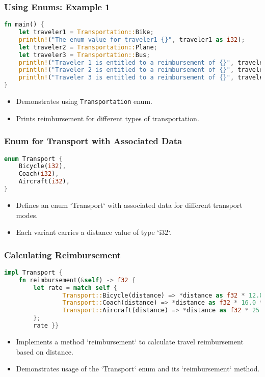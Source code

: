 \documentclass[aspectratio=169, table]{beamer}
\begin{document}
\begin{frame}[fragile]
\frametitle{Using Enums: Example 1}
\vspace{15pt}
\begin{lstlisting}[language=Rust]
fn main() {
	let traveler1 = Transportation::Bike;
	println!("The enum value for traveler1 {}", traveler1 as i32);
	let traveler2 = Transportation::Plane; 
	let traveler3 = Transportation::Bus;
	println!("Traveler 1 is entitled to a reimbursement of {}", traveler1.reimbursement(70)); 
	println!("Traveler 2 is entitled to a reimbursement of {}", traveler2.reimbursement(150)); 
	println!("Traveler 3 is entitled to a reimbursement of {}", traveler3.reimbursement(70)); 
}
\end{lstlisting}
\begin{itemize}
\item Demonstrates using \texttt{Transportation} enum.
\item Prints reimbursement for different types of transportation.
\end{itemize}
\end{frame}

\begin{frame}[fragile]
\frametitle{Enum for Transport with Associated Data}
\begin{lstlisting}[language=Rust]
enum Transport {
	Bicycle(i32), 
	Coach(i32),
	Aircraft(i32),
}
\end{lstlisting}
\begin{itemize}
\item Defines an enum `Transport` with associated data for different transport modes.
\item Each variant carries a distance value of type `i32`.
\end{itemize}
\end{frame}

\begin{frame}[fragile]
\frametitle{Calculating Reimbursement}
\vspace{15pt}
\begin{lstlisting}[language=Rust]
impl Transport {
	fn reimbursement(&self) -> f32 {
		let rate = match self {
				Transport::Bicycle(distance) => *distance as f32 * 12.0 * 1.5,  
				Transport::Coach(distance) => *distance as f32 * 16.0 * 1.5,
				Transport::Aircraft(distance) => *distance as f32 * 25.0 * 1.5,
		}; 
		rate }}
\end{lstlisting}
\begin{itemize}
\item Implements a method `reimbursement` to calculate travel reimbursement based on distance.
\item Demonstrates usage of the `Transport` enum and its `reimbursement` method.
\end{itemize}
\end{frame}
\end{document}
